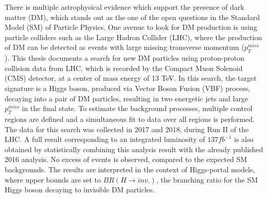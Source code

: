
There is multiple astrophysical evidence which support the presence of dark matter (DM), which stands out as the
one of the open questions in the Standard Model (SM) of Particle Physics. One avenue to look for DM production is using particle colliders 
such as the Large Hadron Collider (LHC), where the production of DM can be detected as events with large missing transverse momentum ($p_T^{miss}$).
This thesis documents a search for new DM particles using proton-proton collision data from LHC, which is recorded by the Compact Muon Solenoid (CMS)
detector, at a center of mass energy of 13 TeV. In this search, the target signature is a Higgs boson, produced via Vector Boson Fusion (VBF) process, 
decaying into a pair of DM particles, resulting in two energetic jets and large $p_T^{miss}$ in the final state. To estimate the background processes,
multiple control regions are defined and a simultaneous fit to data over all regions is performed. The data for this search was collected in 2017 and 2018, during Run II of the LHC. A full result corresponding to an integrated luminosity of $137 fb^{-1}$
is also obtained by statistically combining this analysis result with the already published 2016 analysis. No excess of events is observed, compared to the
expected SM backgrounds. The results are interpreted in the context of Higgs-portal models, where upper bounds are set to $BR(H\rightarrow inv.)$, 
the branching ratio for the SM Higgs boson decaying to invisible DM particles.


